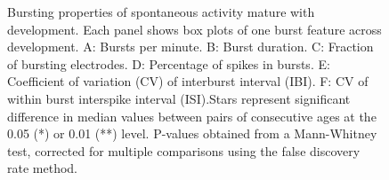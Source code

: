\documentclass{article}
\begin{document}
\begin{figure}
  \centering
  \caption{Bursting properties of spontaneous activity mature with
    development.  Each panel shows box plots of one burst feature
    across development. A: Bursts
    per minute. B: Burst duration. C: Fraction of bursting electrodes. D: Percentage of spikes in
    bursts.  E: Coefficient of variation (CV) of interburst interval
    (IBI).  F: CV of within burst interspike interval (ISI).Stars represent significant difference in median values between pairs of consecutive ages at the 0.05 (*) or 0.01 (**) level. P-values obtained from a Mann-Whitney test, corrected for multiple comparisons using the false discovery rate method.}
\end{figure}
\end{document}
